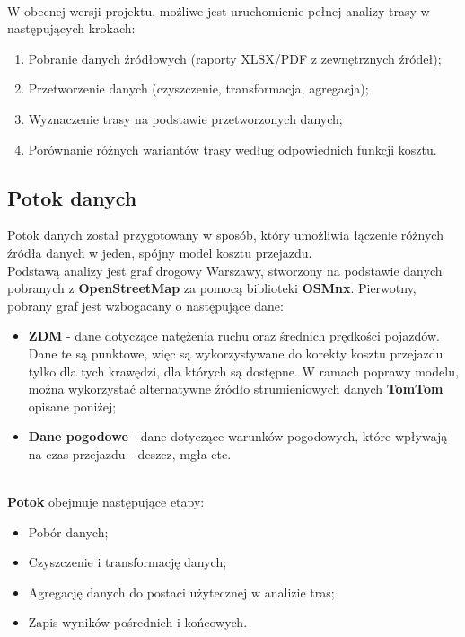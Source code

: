 \documentclass[12pt]{article}
\begin{document}
\noindent \\W obecnej wersji projektu, możliwe jest uruchomienie pełnej analizy trasy w następujących krokach:
\begin{enumerate}
    \item Pobranie danych źródłowych (raporty XLSX/PDF z zewnętrznych źródeł);
    \item Przetworzenie danych (czyszczenie, transformacja, agregacja);
    \item Wyznaczenie trasy na podstawie przetworzonych danych;
    \item Porównanie różnych wariantów trasy według odpowiednich funkcji kosztu.
\end{enumerate}

\subsection{Potok danych}

\noindent Potok danych został przygotowany w sposób, który umożliwia łączenie różnych źródła danych w jeden, spójny model kosztu przejazdu.\\

\noindent Podstawą analizy jest graf drogowy Warszawy, stworzony na podstawie danych pobranych z \textbf{OpenStreetMap} za pomocą biblioteki \textbf{OSMnx}. 
Pierwotny, pobrany graf jest wzbogacany o następujące dane:
\begin{itemize}
    \item \textbf{ZDM} - dane dotyczące natężenia ruchu oraz średnich prędkości pojazdów. Dane te są punktowe, więc są wykorzystywane do korekty
                            kosztu przejazdu tylko dla tych krawędzi, dla których są dostępne. W ramach poprawy modelu, można wykorzystać alternatywne
                            źródło strumieniowych danych \textbf{TomTom} opisane poniżej;
    \item \textbf{Dane pogodowe} - dane dotyczące warunków pogodowych, które wpływają na czas przejazdu - deszcz, mgła etc.
\end{itemize}

\noindent \\\textbf{Potok} obejmuje następujące etapy:
\begin{itemize}
    \item Pobór danych;
    \item Czyszczenie i transformację danych;
    \item Agregację danych do postaci użytecznej w analizie tras;
    \item Zapis wyników pośrednich i końcowych.
\end{itemize}
\end{document}
